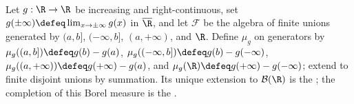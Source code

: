 \begin{definition} \label{def:borel-lebesgue-stieltjes-measures} \\
Let $g:\R\to\R$ be increasing and right-continuous, set $g(\pm\infty)\defeq\lim_{x\to\pm\infty}g(x)$ in $\overline{\R}$, and let $\mathcal{F}$ be the algebra of finite unions generated by $(a,b]$, $(-\infty,b]$, $(a,+\infty)$, and $\R$. Define $\mu_g$ on generators by $\mu_g((a,b])\defeq g(b)-g(a)$, $\mu_g((-\infty,b])\defeq g(b)-g(-\infty)$, $\mu_g((a,+\infty))\defeq g(+\infty)-g(a)$, and $\mu_g(\R)\defeq g(+\infty)-g(-\infty)$; extend to finite disjoint unions by summation. Its unique extension to $\mathcal{B}(\R)$ is the ; the completion of this Borel measure is the .
\end{definition}

